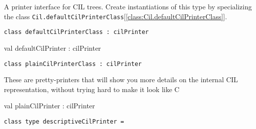 \documentclass[11pt]{article}
\begin{document}
\begin{ocamldocdescription}
A printer interface for CIL trees. Create instantiations of 
 this type by specializing the class {\tt{Cil.defaultCilPrinterClass}}[\ref{class:Cil.defaultCilPrinterClass}].


\end{ocamldocdescription}




\begin{ocamldoccode}
{\tt{class defaultCilPrinterClass : }}{\tt{cilPrinter}}\end{ocamldoccode}
\label{class:Cil.defaultCilPrinterClass}







\label{val:Cil.defaultCilPrinter}\begin{ocamldoccode}
val defaultCilPrinter : cilPrinter
\end{ocamldoccode}




\begin{ocamldoccode}
{\tt{class plainCilPrinterClass : }}{\tt{cilPrinter}}\end{ocamldoccode}
\label{class:Cil.plainCilPrinterClass}



\begin{ocamldocdescription}
These are pretty-printers that will show you more details on the internal 
 CIL representation, without trying hard to make it look like C


\end{ocamldocdescription}




\label{val:Cil.plainCilPrinter}\begin{ocamldoccode}
val plainCilPrinter : cilPrinter
\end{ocamldoccode}




\begin{ocamldoccode}
{\tt{class type descriptiveCilPrinter = }}\end{ocamldoccode}
\label{classtype:Cil.descriptiveCilPrinter}
\end{document}
